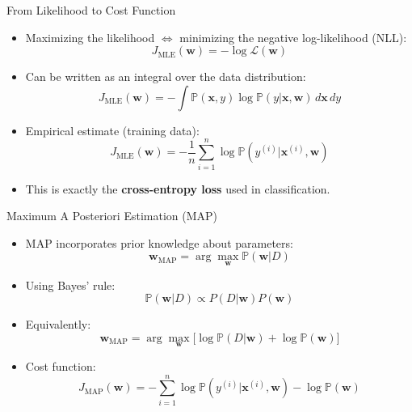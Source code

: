 \documentclass[serif, aspectratio=169]{beamer}
\begin{document}
\begin{frame}{From Likelihood to Cost Function}
    \begin{itemize}
        \item Maximizing the likelihood $\Leftrightarrow$ minimizing the negative log-likelihood (NLL):
        \[
            J_{\text{MLE}}(\mathbf{w}) = -\log \mathcal{L}(\mathbf{w})
        \]
        \item Can be written as an integral over the data distribution:
        \[
            J_{\text{MLE}}(\mathbf{w}) = - \int \mathbb{P}(\mathbf{x},y) \log \mathbb{P}(y|\mathbf{x}, \mathbf{w}) \, d\mathbf{x}\,dy
        \]
        \item Empirical estimate (training data):
        \[
            J_{\text{MLE}}(\mathbf{w}) = -\frac{1}{n}\sum_{i=1}^{n} \log \mathbb{P}(y^{(i)}|\mathbf{x}^{(i)}, \mathbf{w})
        \]
        \item This is exactly the \textbf{cross-entropy loss} used in classification.
    \end{itemize}
\end{frame}

\begin{frame}{Maximum A Posteriori Estimation (MAP)}
    \begin{itemize}
        \item MAP incorporates prior knowledge about parameters:
        \[
            \mathbf{w}_{\text{MAP}} = \arg\max_{\mathbf{w}}       \mathbb{P}(\mathbf{w}|D)
        \]
        \item Using Bayes’ rule:
        \[
            \mathbb{P}(\mathbf{w}|D) \propto P(D|\mathbf{w})P(\mathbf{w})
        \]
        \item Equivalently:
        \[
            \mathbf{w}_{\text{MAP}} = \arg\max_{\mathbf{w}} \Big[ \log \mathbb{P}(D|\mathbf{w}) + \log \mathbb{P}(\mathbf{w}) \Big]
        \]
        \item Cost function:
        \[
            J_{\text{MAP}}(\mathbf{w}) = - \sum_{i=1}^n \log \mathbb{P}(y^{(i)}|\mathbf{x}^{(i)}, \mathbf{w}) - \log \mathbb{P}(\mathbf{w})
        \]
    \end{itemize}
\end{frame}
\end{document}
